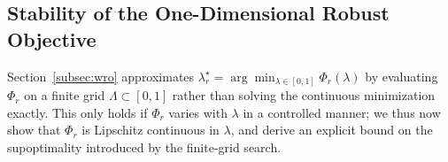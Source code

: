 

\subsection{Stability of the One-Dimensional Robust Objective}\label{sec:stability}
Section~\ref{subsec:wro} approximates $\lambda_r^\star=\arg\min_{\lambda\in[0,1]}\Phi_r(\lambda)$ by evaluating $\Phi_r$ on a finite grid $\Lambda\subset[0,1]$ rather than solving the continuous minimization exactly.
This only holds if $\Phi_r$ varies with $\lambda$ in a controlled manner; we thus now show that $\Phi_r$ is Lipschitz continuous in $\lambda$, and derive an explicit bound on the supoptimality introduced by the finite-grid search.

